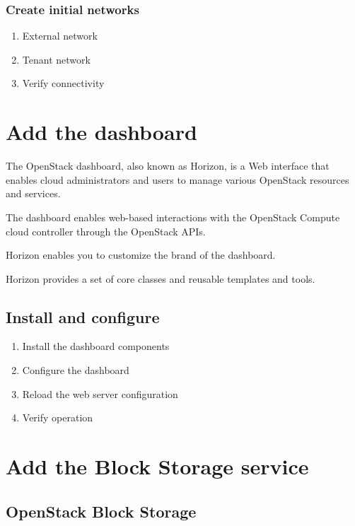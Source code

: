     \subsubsection{Create initial networks}
        \begin{enumerate}
            \item External network
            \item Tenant network
            \item Verify connectivity
        \end{enumerate}   
    
\section{Add the dashboard}
    \par The OpenStack dashboard, also known as Horizon, is a Web interface that enables cloud administrators and users to manage various OpenStack resources and services.

    \par The dashboard enables web-based interactions with the OpenStack Compute cloud controller through the OpenStack APIs.

    \par Horizon enables you to customize the brand of the dashboard.

    \par Horizon provides a set of core classes and reusable templates and tools.
    \subsection{Install and configure}
        \begin{enumerate}
            \item Install the dashboard components
            \item Configure the dashboard
            \item Reload the web server configuration
            \item Verify operation
        \end{enumerate}
        
        
\section{Add the Block Storage service}

    \subsection{OpenStack Block Storage}
    
